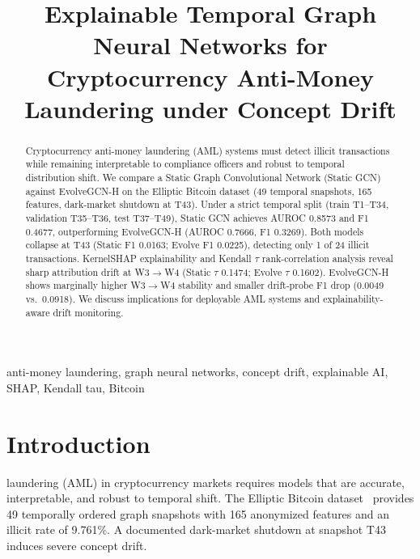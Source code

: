 \documentclass[conference]{IEEEtran}
\begin{document}
\title{Explainable Temporal Graph Neural Networks for Cryptocurrency Anti-Money Laundering under Concept Drift}

\author{
}

\maketitle

\begin{abstract}
Cryptocurrency anti-money laundering (AML) systems must detect illicit transactions while remaining interpretable to compliance officers and robust to temporal distribution shift. We compare a Static Graph Convolutional Network (Static GCN) against EvolveGCN-H on the Elliptic Bitcoin dataset (49 temporal snapshots, 165 features, dark-market shutdown at T43). Under a strict temporal split (train T1--T34, validation T35--T36, test T37--T49), Static GCN achieves AUROC 0.8573 and F1 0.4677, outperforming EvolveGCN-H (AUROC 0.7666, F1 0.3269). Both models collapse at T43 (Static F1 0.0163; Evolve F1 0.0225), detecting only 1 of 24 illicit transactions. KernelSHAP explainability and Kendall $\tau$ rank-correlation analysis reveal sharp attribution drift at W3$\rightarrow$W4 (Static $\tau$ 0.1474; Evolve $\tau$ 0.1602). EvolveGCN-H shows marginally higher W3$\rightarrow$W4 stability and smaller drift-probe F1 drop (0.0049 vs.\ 0.0918). We discuss implications for deployable AML systems and explainability-aware drift monitoring.
\end{abstract}

\begin{IEEEkeywords}
anti-money laundering, graph neural networks, concept drift, explainable AI, SHAP, Kendall tau, Bitcoin
\end{IEEEkeywords}

\section{Introduction}
 laundering (AML) in cryptocurrency markets requires models that are accurate, interpretable, and robust to temporal shift. The Elliptic Bitcoin dataset~\cite{weber2019anti} provides 49 temporally ordered graph snapshots with 165 anonymized features and an illicit rate of 9.761\%. A documented dark-market shutdown at snapshot T43 induces severe concept drift.
\end{document}
